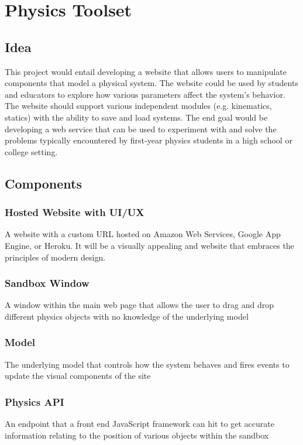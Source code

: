 \documentclass[pdftex,11pt,a4paper]{article}
\begin{document}


\section{Physics Toolset}
\subsection{Idea}
This project would entail developing a website that allows users to manipulate components that model a physical system. The website could be used by students and educators to explore how various parameters affect the system's behavior. The website should support various independent modules (e.g. kinematics, statics) with the ability to save and load systems. The end goal would be developing a web service that can be used to experiment with and solve the problems typically encountered by first-year physics students in a high school or college setting.

\subsection{Components}
\subsubsection{Hosted Website with UI/UX}
A website with a custom URL hosted on Amazon Web Services, Google App Engine, or Heroku. It will be a visually appealing and website that embraces the principles of modern design.

\subsubsection{Sandbox Window}
A window within the main web page that allows the user to drag and drop different physics objects with no knowledge of the underlying model

\subsubsection{Model}
The underlying model that controls how the system behaves and fires events to update the visual components of the site

\subsubsection{Physics API}
An endpoint that a front end JavaScript framework can hit to get accurate information relating to the position of various objects within the sandbox
\end{document}
